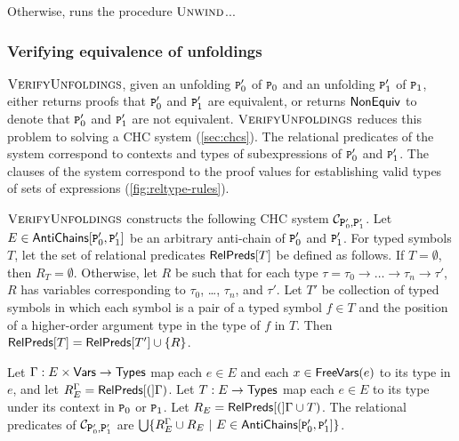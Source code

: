 Otherwise, \chkindaux runs the procedure $\textsc{Unwind}$...

\subsubsection{Verifying equivalence of unfoldings}
\label{sec:verify-ders}
$\textsc{VerifyUnfoldings}$, given an unfolding $\cc{P}_0'$ of $\cc{P}_0$ and
an unfolding $\cc{P}_1'$ of $\cc{P}_1$, either returns proofs that
$\cc{P}_0'$ and $\cc{P}_1'$ are equivalent, or returns $\mathsf{NonEquiv}$ to
denote that $\cc{P}_0'$ and $\cc{P}_1'$ are not equivalent.
%
$\textsc{VerifyUnfoldings}$ reduces this problem to solving a CHC system
(\autoref{sec:chcs}).
%
The relational predicates of the system correspond to contexts and
types of subexpressions of $\cc{P}_0'$ and $\cc{P}_1'$.
%
The clauses of the system correspond to the proof values for
establishing valid types of sets of expressions
(\autoref{fig:reltype-rules}).

$\textsc{VerifyUnfoldings}$ constructs the following CHC system $\mathcal{C}_{
  \cc{P}_0', \cc{P}_1' }$.
Let $E \in \antichains{ \cc{P}_0' }{ \cc{P}_1' }$ be an arbitrary
anti-chain of $\cc{P}_0'$ and $\cc{P}_1'$.
For typed symbols $T$, let the set of relational predicates
$\mathsf{RelPreds}[ T ]$ be defined as follows.
If $T = \emptyset$, then $R_T = \emptyset$.
Otherwise, let $R$ be such that for each type $\tau = \tau_0
\rightarrow \ldots \rightarrow \tau_n \rightarrow \tau'$, $R$ has
variables corresponding to $\tau_0$, \ldots, $\tau_n$, and $\tau'$.
%
Let $T'$ be collection of typed symbols in which each symbol is a pair
of a typed symbol $f \in T$ and the position of a higher-order
argument type in the type of $f$ in $T$.
%
Then $\mathsf{RelPreds}[ T ] = \mathsf{RelPreds}[  T'  ]  \cup \{  R  \}$.

Let $\Gamma : E \times \mathsf{Vars} \to \mathsf{Types}$ map each $e \in E$ and each
$x \in \mathsf{FreeVars}(e)$ to its type in $e$, and let $R_E^{\Gamma} =
\mathsf{RelPreds}[ ( ]\Gamma)$.
%
Let $T: E \to \mathsf{Types}$ map each $e \in E$ to its type under its context
in $\cc{P}_0$ or $\cc{P}_1$.
%
%
Let $R_E = \mathsf{RelPreds}[ ( ]\Gamma \cup T)$.
%
The relational predicates of $\mathcal{C}_{ \cc{P}_0', \cc{P}_1' }$
are $\bigunion \setformer{ R_E^{\Gamma} \union R_E }{ E \in
  \antichains{ \cc{P}_0' }{ \cc{P}_1' }}$.

